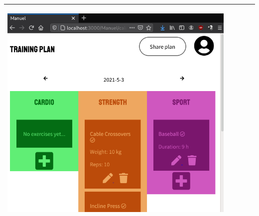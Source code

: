 \documentclass[12pt,twoside,titlepage,a4paper]{article}
\theoremstyle{definicion}
\theoremstyle{lema}
\theoremstyle{teorema}
\theoremstyle{corolario}
\theoremstyle{ejemplo}
\theoremstyle{nota}
\begin{document}
\begin{table}[!ht]
\begin{tabular}{|m{0.6cm}|m{2.9cm}|m{3.6cm}|m{1.1cm}|m{5.9cm}|}
		\begin{center}\includegraphics[scale=0.24]{userpage2-calendar1.png}\end{center} \\
		\hline
	\end{tabular}
\end{table}
\newpage
\end{document}
